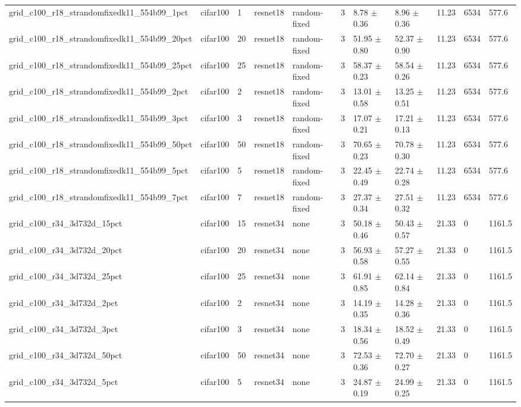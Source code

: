 \begin{tabular}{lllllllllll}
grid_c100_r18_strandomfixedk11_554b99_1pct & cifar100 & 1 & resnet18 & random-fixed & 3 & 8.78 $\pm$ 0.36 & 8.96 $\pm$ 0.36 & 11.23 & 6534 & 577.6 \\
grid_c100_r18_strandomfixedk11_554b99_20pct & cifar100 & 20 & resnet18 & random-fixed & 3 & 51.95 $\pm$ 0.80 & 52.37 $\pm$ 0.90 & 11.23 & 6534 & 577.6 \\
grid_c100_r18_strandomfixedk11_554b99_25pct & cifar100 & 25 & resnet18 & random-fixed & 3 & 58.37 $\pm$ 0.23 & 58.54 $\pm$ 0.26 & 11.23 & 6534 & 577.6 \\
grid_c100_r18_strandomfixedk11_554b99_2pct & cifar100 & 2 & resnet18 & random-fixed & 3 & 13.01 $\pm$ 0.58 & 13.25 $\pm$ 0.51 & 11.23 & 6534 & 577.6 \\
grid_c100_r18_strandomfixedk11_554b99_3pct & cifar100 & 3 & resnet18 & random-fixed & 3 & 17.07 $\pm$ 0.21 & 17.21 $\pm$ 0.13 & 11.23 & 6534 & 577.6 \\
grid_c100_r18_strandomfixedk11_554b99_50pct & cifar100 & 50 & resnet18 & random-fixed & 3 & 70.65 $\pm$ 0.23 & 70.78 $\pm$ 0.30 & 11.23 & 6534 & 577.6 \\
grid_c100_r18_strandomfixedk11_554b99_5pct & cifar100 & 5 & resnet18 & random-fixed & 3 & 22.45 $\pm$ 0.49 & 22.74 $\pm$ 0.28 & 11.23 & 6534 & 577.6 \\
grid_c100_r18_strandomfixedk11_554b99_7pct & cifar100 & 7 & resnet18 & random-fixed & 3 & 27.37 $\pm$ 0.34 & 27.51 $\pm$ 0.32 & 11.23 & 6534 & 577.6 \\
grid_c100_r34_3d732d_15pct & cifar100 & 15 & resnet34 & none & 3 & 50.18 $\pm$ 0.46 & 50.43 $\pm$ 0.57 & 21.33 & 0 & 1161.5 \\
grid_c100_r34_3d732d_20pct & cifar100 & 20 & resnet34 & none & 3 & 56.93 $\pm$ 0.58 & 57.27 $\pm$ 0.55 & 21.33 & 0 & 1161.5 \\
grid_c100_r34_3d732d_25pct & cifar100 & 25 & resnet34 & none & 3 & 61.91 $\pm$ 0.85 & 62.14 $\pm$ 0.84 & 21.33 & 0 & 1161.5 \\
grid_c100_r34_3d732d_2pct & cifar100 & 2 & resnet34 & none & 3 & 14.19 $\pm$ 0.35 & 14.28 $\pm$ 0.36 & 21.33 & 0 & 1161.5 \\
grid_c100_r34_3d732d_3pct & cifar100 & 3 & resnet34 & none & 3 & 18.34 $\pm$ 0.56 & 18.52 $\pm$ 0.49 & 21.33 & 0 & 1161.5 \\
grid_c100_r34_3d732d_50pct & cifar100 & 50 & resnet34 & none & 3 & 72.53 $\pm$ 0.36 & 72.70 $\pm$ 0.27 & 21.33 & 0 & 1161.5 \\
grid_c100_r34_3d732d_5pct & cifar100 & 5 & resnet34 & none & 3 & 24.87 $\pm$ 0.19 & 24.99 $\pm$ 0.25 & 21.33 & 0 & 1161.5 \\

\end{tabular}

